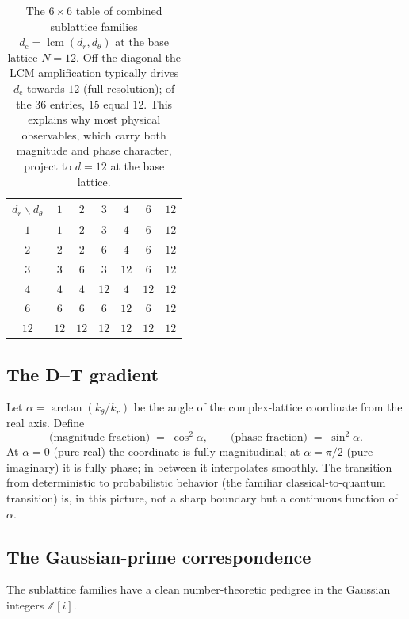 \documentclass[11pt,a4paper]{article}
\theoremstyle{definition}
\theoremstyle{remark}
\newcommand{\Z}{\mathbb{Z}}
\DeclareMathOperator{\lcm}{lcm}
\begin{document}
\begin{table}[h]
\centering
\begin{tabular}{@{}c c c c c c c@{}}
\toprule
$d_{r}\backslash d_{\theta}$ & $1$ & $2$ & $3$ & $4$ & $6$ & $12$\\
\midrule
$1$ & $1$ & $2$ & $3$ & $4$ & $6$ & $12$\\
$2$ & $2$ & $2$ & $6$ & $4$ & $6$ & $12$\\
$3$ & $3$ & $6$ & $3$ & $12$ & $6$ & $12$\\
$4$ & $4$ & $4$ & $12$ & $4$ & $12$ & $12$\\
$6$ & $6$ & $6$ & $6$ & $12$ & $6$ & $12$\\
$12$ & $12$ & $12$ & $12$ & $12$ & $12$ & $12$\\
\bottomrule
\end{tabular}
\caption{The $6\times 6$ table of combined sublattice families $d_{\mathrm{c}}=\lcm(d_{r},d_{\theta})$ at the base lattice $N=12$. Off the diagonal the LCM amplification typically drives $d_{\mathrm{c}}$ towards $12$ (full resolution); of the $36$ entries, $15$ equal $12$. This explains why most physical observables, which carry both magnitude and phase character, project to $d=12$ at the base lattice.}
\label{tab:complex12}
\end{table}

\subsection{The D--T gradient}

Let $\alpha = \arctan(k_{\theta}/k_{r})$ be the angle of the complex-lattice coordinate from the real axis. Define
\[
\text{(magnitude fraction)} \;=\; \cos^{2}\alpha, \qquad \text{(phase fraction)} \;=\; \sin^{2}\alpha.
\]
At $\alpha=0$ (pure real) the coordinate is fully magnitudinal; at $\alpha=\pi/2$ (pure imaginary) it is fully phase; in between it interpolates smoothly. The transition from deterministic to probabilistic behavior (the familiar classical-to-quantum transition) is, in this picture, not a sharp boundary but a continuous function of $\alpha$.

\subsection{The Gaussian-prime correspondence}

The sublattice families have a clean number-theoretic pedigree in the Gaussian integers $\Z[i]$.
\end{document}
